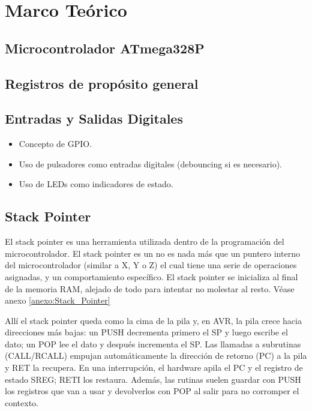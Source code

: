 \section{Marco Teórico}

\subsection{Microcontrolador ATmega328P}

\subsection{Registros de propósito general}

\subsection{Entradas y Salidas Digitales}
\begin{itemize}
    \item Concepto de GPIO.
    \item Uso de pulsadores como entradas digitales (debouncing si es necesario).
    \item Uso de LEDs como indicadores de estado.
\end{itemize}

\subsection{Stack Pointer}
El stack pointer es una herramienta utilizada dentro de la programación del microcontrolador. El stack pointer es un no es nada más que un puntero interno del microcontrolador (similar a X, Y o Z) el cual tiene una serie de operaciones asignadas, y un comportamiento específico. El stack pointer se inicializa al final de la memoria RAM, alejado de todo para intentar no molestar al resto. Véase anexo \ref{anexo:Stack_Pointer}

Allí el stack pointer queda como la cima de la pila y, en AVR, la pila crece hacia direcciones más bajas: un PUSH decrementa primero el SP y luego escribe el dato; un POP lee el dato y después incrementa el SP. Las llamadas a subrutinas (CALL/RCALL) empujan automáticamente la dirección de retorno (PC) a la pila y RET la recupera. En una interrupción, el hardware apila el PC y el registro de estado SREG; RETI los restaura. Además, las rutinas suelen guardar con PUSH los registros que van a usar y devolverlos con POP al salir para no corromper el contexto.

